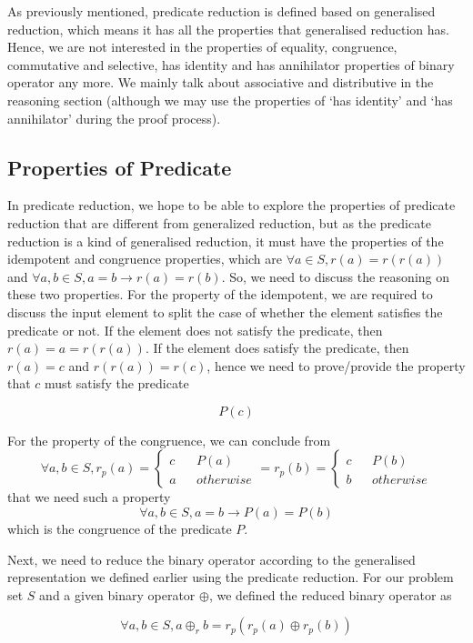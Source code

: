 \documentclass[a4paper,12pt,twoside,openright]{report}
\newcommand{\e}[2]{
\begin{equation}
  \label{#1} 
  #2
\end{equation}
}
\begin{document}
As previously mentioned, predicate reduction is defined based on generalised reduction, which means it has all the properties that generalised reduction has. Hence, we are not interested in the properties of equality, congruence, commutative and selective, has identity and has annihilator properties of binary operator any more.  We mainly talk about associative and distributive in the reasoning section (although we may use the properties of ‘has identity’ and ‘has annihilator’ during the proof process). 

\subsection{Properties of Predicate}
In predicate reduction, we hope to be able to explore the properties of predicate reduction that are different from generalized reduction, but as the predicate reduction is a kind of generalised reduction, it must have the properties of the idempotent and congruence properties, which are $\forall a \in S, r(a) = r(r(a))$ and $\forall a,b\in S, a = b \rightarrow r(a) = r(b)$. So, we need to discuss the reasoning on these two properties. For the property of the idempotent, we are required to discuss the input element to split the case of whether the element satisfies the predicate or not. If the element does not satisfy the predicate, then $r(a) = a = r(r(a))$. If the element does satisfy the predicate, then $r(a) = c$ and $r(r(a)) = r(c)$, hence we need to prove/provide the property that $c$ must satisfy the predicate
\e{pr:proof:p_true}{P(c)}
For the property of the congruence, we can conclude from 
\[\forall a,b \in S, r_p(a)=\left\{
\begin{aligned}
c &  & P(a) \\
a &  & otherwise 
\end{aligned}
\right. = 
r_p(b)=\left\{
\begin{aligned}
c &  & P(b) \\
b &  & otherwise 
\end{aligned}
\right.\] that we need such a property \e{pr:proof:p_cong}{\forall a,b \in S, a = b \rightarrow P(a) = P(b)} which is the congruence of the predicate $P$.

Next, we need to reduce the binary operator according to the generalised representation we defined earlier using the predicate reduction. For our problem set $S$ and a given binary operator $\oplus$, we defined the reduced binary operator as 
\e{pr:def:binary_operator}{\forall a,b \in S, a \oplus_r b = r_p (r_p(a) \oplus r_p(b))}
\end{document}
